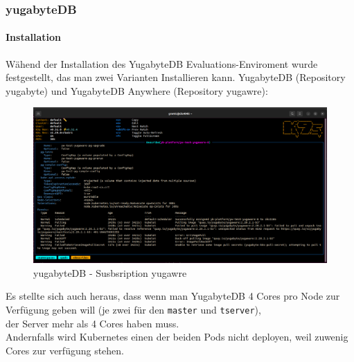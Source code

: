 
\begin{flushleft}
    \subsubsection{yugabyteDB}
    \paragraph{Installation}
    Wähend der Installation des YugabyteDB Evaluations-Enviroment wurde festgestellt, das man zwei Varianten Installieren kann.
    YugabyteDB (Repository yugabyte) und YugabyteDB Anywhere (Repository yugawre):
    \begin{figure}[H]
        \centering
        \includegraphics[width=1\linewidth]{source/implementation/evaluation/platforms/yugabytedb_pod_installation_subscription_interrup}
        \caption{yugabyteDB - Susbsription yugawre}
        \label{fig:yugabytedb_pod_installation_subscription_interrup}
    \end{figure}
\end{flushleft}
\begin{flushleft}
    Es stellte sich auch heraus, dass wenn man YugabyteDB 4 Cores pro Node zur Verfügung geben will (je zwei für den \texttt{master} und \texttt{tserver}),\\
    der Server mehr als 4 Cores haben muss.\\
    Andernfalls wird Kubernetes einen der beiden Pods nicht deployen, weil zuwenig Cores zur verfügung stehen.
\end{flushleft}
